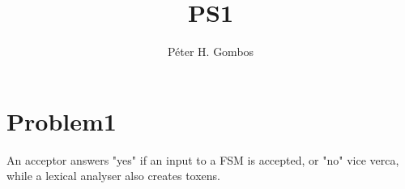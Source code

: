 \documentclass{article}
\title{PS1}
\author{Péter H. Gombos}
\begin{document}
\maketitle
\section{Problem1}
An acceptor answers "yes" if an input to a FSM is accepted, or "no" vice verca, while a lexical analyser also creates toxens.
\end{document}
